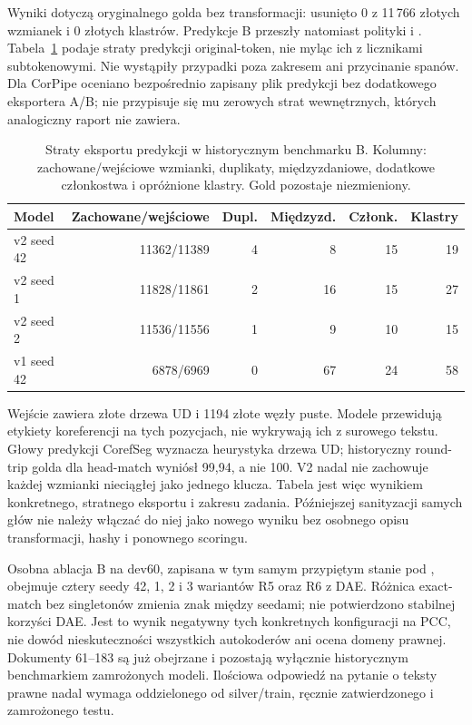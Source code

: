Wyniki dotyczą oryginalnego golda bez transformacji: usunięto 0 z 11\,766 złotych wzmianek i 0 złotych klastrów. Predykcje B przeszły natomiast polityki  i . Tabela~\ref{tab:benchmark-b-loss} podaje straty predykcji original-token, nie myląc ich z licznikami subtokenowymi. Nie wystąpiły przypadki poza zakresem ani przycinanie spanów. Dla CorPipe oceniano bezpośrednio zapisany plik predykcji bez dodatkowego eksportera A/B; nie przypisuje się mu zerowych strat wewnętrznych, których analogiczny raport nie zawiera.

\begin{table}[htbp]
  \centering
  \small
  \caption{Straty eksportu predykcji w historycznym benchmarku B. Kolumny: zachowane/wejściowe wzmianki, duplikaty, międzyzdaniowe, dodatkowe członkostwa i opróżnione klastry. Gold pozostaje niezmieniony.}
  \label{tab:benchmark-b-loss}
  \begin{tabular}{lrrrrr}
    \toprule
    Model & Zachowane/wejściowe & Dupl. & Międzyzd. & Członk. & Klastry \\
    \midrule
    v2 seed 42 & 11362/11389 & 4 & 8 & 15 & 19 \\
    v2 seed 1 & 11828/11861 & 2 & 16 & 15 & 27 \\
    v2 seed 2 & 11536/11556 & 1 & 9 & 10 & 15 \\
    v1 seed 42 & 6878/6969 & 0 & 67 & 24 & 58 \\
    \bottomrule
  \end{tabular}
\end{table}

Wejście zawiera złote drzewa UD i 1194 złote węzły puste. Modele przewidują etykiety koreferencji na tych pozycjach, nie wykrywają ich z surowego tekstu. Głowy predykcji CorefSeg wyznacza heurystyka drzewa UD; historyczny round-trip golda dla head-match wyniósł 99,94, a nie 100. V2 nadal nie zachowuje każdej wzmianki nieciągłej jako jednego klucza. Tabela jest więc wynikiem konkretnego, stratnego eksportu i zakresu zadania. Późniejszej sanityzacji samych głów nie należy włączać do niej jako nowego wyniku bez osobnego opisu transformacji, hashy i ponownego scoringu.

Osobna ablacja B na dev60, zapisana w tym samym przypiętym stanie pod , obejmuje cztery seedy 42, 1, 2 i 3 wariantów R5 oraz R6 z DAE. Różnica exact-match bez singletonów zmienia znak między seedami; nie potwierdzono stabilnej korzyści DAE. Jest to wynik negatywny tych konkretnych konfiguracji na PCC, nie dowód nieskuteczności wszystkich autokoderów ani ocena domeny prawnej. Dokumenty 61--183 są już obejrzane i pozostają wyłącznie historycznym benchmarkiem zamrożonych modeli. Ilościowa odpowiedź na pytanie o teksty prawne nadal wymaga oddzielonego od silver/train, ręcznie zatwierdzonego i zamrożonego testu.

